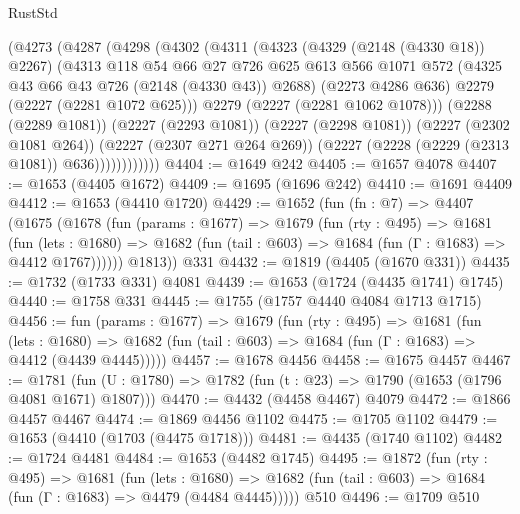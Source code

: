 \begin{lexlean}{RustStd}
\begin{coremodule}
              (@4273
                (@4287
                  (@4298
                    (@4302
                      (@4311
                        (@4323
                          (@4329 (@2148 (@4330 @18)) @2267)
                          (@4313
                            @118
                            @54
                            @66
                            @27
                            @726
                            @625
                            @613
                            @566
                            @1071
                            @572
                            (@4325 @43 @66 @43 @726 (@2148 (@4330 @43)) @2688)
                            (@2273 @4286 @636)
                            @2279
                            (@2227 (@2281 @1072 @625)))
                          @2279
                          (@2227 (@2281 @1062 @1078)))
                        (@2288 (@2289 @1081))
                        (@2227 (@2293 @1081))
                        (@2227 (@2298 @1081))
                        (@2227 (@2302 @1081 @264))
                        (@2227 (@2307 @271 @264 @269))
                        (@2227 (@2228 (@2229 (@2313 @1081)) @636))))))))))))
@4404 := @1649 @242
@4405 := @1657 @4078
@4407 := @1653 (@4405 @1672)
@4409 := @1695 (@1696 @242)
@4410 := @1691 @4409
@4412 := @1653 (@4410 @1720)
@4429 := @1652
    (fun (fn : @7) =>
    @4407
      (@1675
        (@1678
          (fun (params : @1677) =>
          @1679
            (fun (rty : @495) =>
            @1681
              (fun (lets : @1680) =>
              @1682 (fun (tail : @603) => @1684 (fun (Γ : @1683) => @4412 @1767))))))
        @1813))
    @331
@4432 := @1819 (@4405 (@1670 @331))
@4435 := @1732 (@1733 @331) @4081
@4439 := @1653 (@1724 (@4435 @1741) @1745)
@4440 := @1758 @331
@4445 := @1755 (@1757 @4440 @4084 @1713 @1715)
@4456 := fun (params : @1677) =>
  @1679
    (fun (rty : @495) =>
    @1681
      (fun (lets : @1680) =>
      @1682 (fun (tail : @603) => @1684 (fun (Γ : @1683) => @4412 (@4439 @4445)))))
@4457 := @1678 @4456
@4458 := @1675 @4457
@4467 := @1781 (fun (U : @1780) => @1782 (fun (t : @23) => @1790 (@1653 (@1796 @4081 @1671) @1807)))
@4470 := @4432 (@4458 @4467) @4079
@4472 := @1866 @4457 @4467
@4474 := @1869 @4456 @1102
@4475 := @1705 @1102
@4479 := @1653 (@4410 (@1703 (@4475 @1718)))
@4481 := @4435 (@1740 @1102)
@4482 := @1724 @4481
@4484 := @1653 (@4482 @1745)
@4495 := @1872
    (fun (rty : @495) =>
    @1681
      (fun (lets : @1680) =>
      @1682 (fun (tail : @603) => @1684 (fun (Γ : @1683) => @4479 (@4484 @4445)))))
    @510
@4496 := @1709 @510

\end{coremodule}
\end{lexlean}
